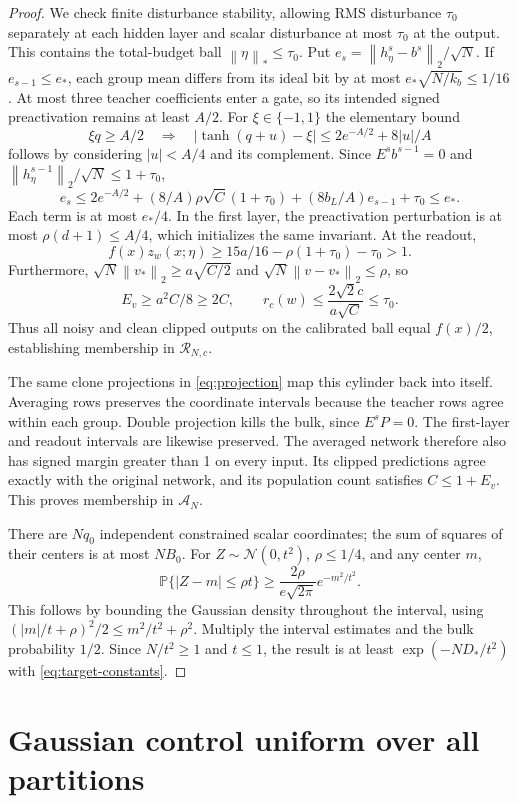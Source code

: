 \documentclass[11pt]{article}
\newcommand{\Prb}{\mathbb P}
\newcommand{\norm}[1]{\left\|#1\right\|}
\begin{document}
\begin{proof}
We check finite disturbance stability, allowing RMS disturbance $\tau_0$
separately at each hidden layer and scalar disturbance at most $\tau_0$
at the output. This contains the total-budget ball $\norm\eta_*\le\tau_0$.
Put $e_s=\norm{h^s_\eta-b^s}_2/\sqrt N$. If $e_{s-1}\le e_*$, each
group mean differs from its ideal bit by at most
$e_*\sqrt{N/k_b}\le1/16$. At most three teacher coefficients enter a
gate, so its intended signed preactivation remains at least $A/2$.
For $\xi\in\{-1,1\}$ the elementary bound
\[
 \xi q\ge A/2\quad\Longrightarrow\quad
 |\tanh(q+u)-\xi|\le2e^{-A/2}+8|u|/A
\]
follows by considering $|u|<A/4$ and its complement. Since
$E^sb^{s-1}=0$ and $\norm{h^{s-1}_\eta}_2/\sqrt N\le1+\tau_0$,
\[
 e_s\le2e^{-A/2}+(8/A)\rho\sqrt C(1+\tau_0)
                 +(8b_L/A)e_{s-1}+\tau_0\le e_*.
\]
Each term is at most $e_*/4$. In the first layer, the preactivation
perturbation is at most $\rho(d+1)\le A/4$, which initializes the same
invariant. At the readout,
\[
 f(x)z_w(x;\eta)\ge15a/16-\rho(1+\tau_0)-\tau_0>1.
\]
Furthermore, $\sqrt N\norm{v_*}_2\ge a\sqrt{C/2}$ and
$\sqrt N\norm{v-v_*}_2\le\rho$, so
\[
 E_v\ge a^2C/8\ge2C,\qquad
 r_c(w)\le\frac{2\sqrt2c}{a\sqrt C}\le\tau_0.
\]
Thus all noisy and clean clipped outputs on the calibrated ball equal
$f(x)/2$, establishing membership in $\mathcal R_{N,c}$.

The same clone projections in \eqref{eq:projection} map this cylinder
back into itself. Averaging rows preserves the coordinate intervals because
the teacher rows agree within each group. Double projection kills the
bulk, since $E^sP=0$. The first-layer and readout intervals are likewise
preserved. The averaged network therefore also has signed margin greater
than 1 on every input. Its clipped predictions agree exactly with the
original network, and its population count satisfies $C\le1+E_v$.
This proves membership in $\mathcal A_N$.

There are $Nq_0$ independent constrained scalar coordinates; the sum of
squares of their centers is at most $NB_0$. For $Z\sim\mathcal N(0,t^2)$,
$\rho\le1/4$, and any center $m$,
\[
 \Prb\{|Z-m|\le\rho t\}
 \ge\frac{2\rho}{e\sqrt{2\pi}}e^{-m^2/t^2}.
\]
This follows by bounding the Gaussian density throughout the interval,
using $(|m|/t+\rho)^2/2\le m^2/t^2+\rho^2$.
Multiply the interval estimates and the bulk probability $1/2$.
Since $N/t^2\ge1$ and $t\le1$, the result is at least
$\exp(-ND_*/t^2)$ with \eqref{eq:target-constants}.
\end{proof}

\section{Gaussian control uniform over all partitions}
\end{document}
